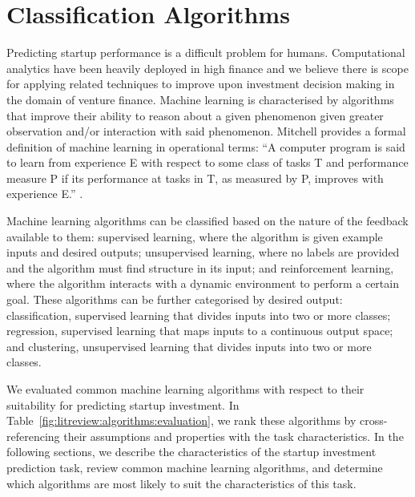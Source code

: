 \documentclass[../thesis/thesis.tex]{subfiles}
\begin{document}
\section{Classification Algorithms}

Predicting startup performance is a difficult problem for humans. Computational analytics have been heavily deployed in high finance and we believe there is scope for applying related techniques to improve upon investment decision making in the domain of venture finance. Machine learning is characterised by algorithms that improve their ability to reason about a given phenomenon given greater observation and/or interaction with said phenomenon. Mitchell provides a formal definition of machine learning in operational terms: ``A computer program is said to learn from experience E with respect to some class of tasks T and performance measure P if its performance at tasks in T, as measured by P, improves with experience E.'' \cite{mitchell1997}.

Machine learning algorithms can be classified based on the nature of the feedback available to them: supervised learning, where the algorithm is given example inputs and desired outputs; unsupervised learning, where no labels are provided and the algorithm must find structure in its input; and reinforcement learning, where the algorithm interacts with a dynamic environment to perform a certain goal. These algorithms can be further categorised by desired output: classification, supervised learning that divides inputs into two or more classes; regression, supervised learning that maps inputs to a continuous output space; and clustering, unsupervised learning that divides inputs into two or more classes.

We evaluated common machine learning algorithms with respect to their suitability for predicting startup investment. In Table~\ref{fig:litreview:algorithms:evaluation}, we rank these algorithms by cross-referencing their assumptions and properties with the task characteristics. In the following sections, we describe the characteristics of the startup investment prediction task, review common machine learning algorithms, and determine which algorithms are most likely to suit the characteristics of this task.
\end{document}
